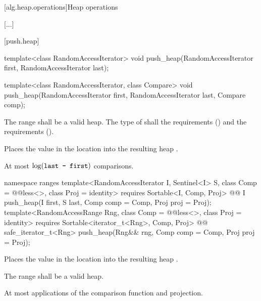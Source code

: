 [alg.heap.operations]{Heap operations}

[...]

[push.heap]{}

%
\begin{itemdecl}
template<class RandomAccessIterator>
  void push_heap(RandomAccessIterator first, RandomAccessIterator last);

template<class RandomAccessIterator, class Compare>
  void push_heap(RandomAccessIterator first, RandomAccessIterator last,
                 Compare comp);
\end{itemdecl}

\begin{itemdescr}
\pnum
\requires
The range
shall be a valid heap.
The type of  shall  
the  requirements
() and the
 requirements
().

\pnum
\effects
Places the value in the location
into the resulting heap
.

\pnum
\complexity
At most
$\log(\texttt{last - first})$
comparisons.
\end{itemdescr}

\begin{addedblock}
%
\begin{itemdecl}
namespace ranges {
  template<RandomAccessIterator I, Sentinel<I> S, class Comp = @@less<>,
      class Proj = identity>
    requires Sortable<I, Comp, Proj>
    @@ I
      push_heap(I first, S last, Comp comp = Comp{}, Proj proj = Proj{});
  template<RandomAccessRange Rng, class Comp = @@less<>, class Proj = identity>
    requires Sortable<iterator_t<Rng>, Comp, Proj>
    @@ safe_iterator_t<Rng>
      push_heap(Rng&& rng, Comp comp = Comp{}, Proj proj = Proj{});
}
\end{itemdecl}

\begin{itemdescr}
\pnum
\effects
Places the value in the location
into the resulting heap
.

\pnum
\requires
The range
shall be a valid heap.

\pnum
\returns {}

\pnum
\complexity
At most
applications of the comparison function and projection.
\end{itemdescr}
\end{addedblock}


